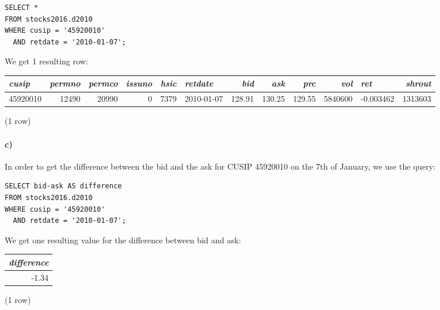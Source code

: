 \documentclass[]{article}
\let\oldparagraph\paragraph
\renewcommand{\paragraph}[1]{\oldparagraph{#1}\mbox{}}
\begin{document}
\color{blue}
\begin{verbatim}
SELECT *
FROM stocks2016.d2010
WHERE cusip = '45920010'
  AND retdate = '2010-01-07';
\end{verbatim}
\color{black}

We get 1 resulting row:

\begin{adjustbox}{width=1.2\linewidth,totalheight=4in, center}
\begin{tabular}{|l | r | r | r | r | l | r | r | r | r | l | r|}
\hline
\textit{cusip} & \textit{permno} & \textit{permco} & \textit{issuno} & \textit{hsic} & \textit{retdate} & \textit{bid} & \textit{ask} & \textit{prc} & \textit{vol} & \textit{ret} & \textit{shrout} \\
\hline
45920010 & 12490 & 20990 & 0 & 7379 & 2010-01-07 & 128.91 & 130.25 & 129.55 & 5840600 & -0.003462 & 1313603 \\
\hline
\end{tabular}
\end{adjustbox}

\begin{center}
\noindent (1 row) \\
\end{center}

\paragraph{c)}
In order to get the difference between the bid and the ask for CUSIP 45920010 on the 7th of January, we use the query:

\color{blue}
\begin{verbatim}
SELECT bid-ask AS difference
FROM stocks2016.d2010
WHERE cusip = '45920010'
  AND retdate = '2010-01-07';
\end{verbatim}
\color{black}

We get one resulting value for the difference between bid and ask:

\begin{center}
\begin{tabular}{|r|}
\hline
\textit{difference} \\
\hline
-1.34 \\
\hline
\end{tabular}

\noindent (1 row) \\
\end{center}

\end{document}
